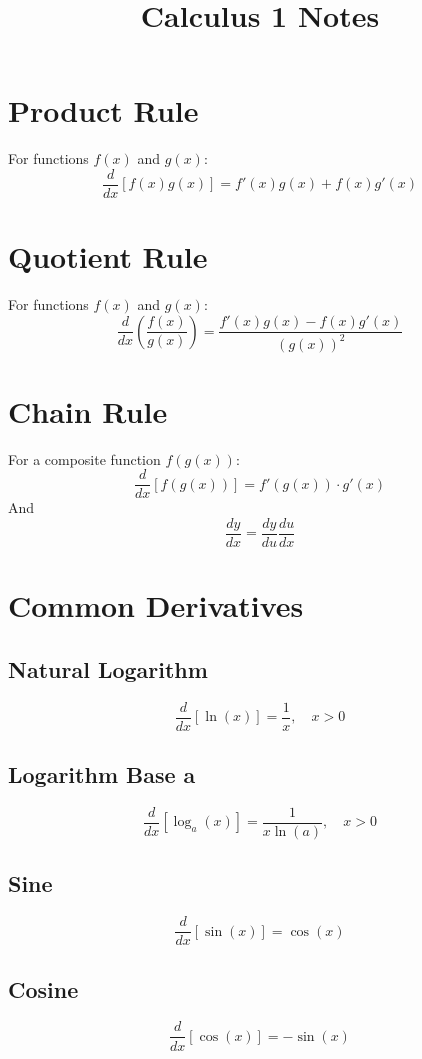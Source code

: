 \documentclass{article}
\begin{document}
\title{Calculus 1 Notes}
\author{}
\date{}

\maketitle

\section{Product Rule}
For functions $f(x)$ and $g(x)$:
\[
\frac{d}{dx}[f(x)g(x)] = f'(x)g(x) + f(x)g'(x)
\]

\section{Quotient Rule}
For functions $f(x)$ and $g(x)$:
\[
	\frac{d}{dx}\left(\frac{f(x)}{g(x)}\right) = \frac{f'(x)g(x)-f(x)g'(x)}{(g(x))^2}
\]

\section{Chain Rule}
For a composite function $f(g(x))$:
\[
\frac{d}{dx}[f(g(x))] = f'(g(x)) \cdot g'(x)
\]
And
\[
\frac{dy}{dx}=\frac{dy}{du}\frac{du}{dx}
\]

\section{Common Derivatives}

\subsection{Natural Logarithm}
\[
\frac{d}{dx}[\ln(x)] = \frac{1}{x}, \quad x > 0
\]

\subsection{Logarithm Base a}
\[
\frac{d}{dx}[\log_{a}(x)] = \frac{1}{x \ln(a)}, \quad x > 0
\]

\subsection{Sine}
\[
\frac{d}{dx}[\sin(x)] = \cos(x)
\]

\subsection{Cosine}
\[
\frac{d}{dx}[\cos(x)] = -\sin(x)
\]
\end{document}
